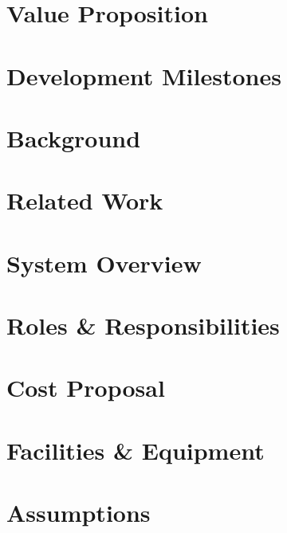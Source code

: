 \documentclass{article}
\begin{document}
\section{Value Proposition}


\section{Development Milestones}


\newpage


\section{Background}


\section{Related Work}


\newpage
\section{System Overview}


\section{Roles \& Responsibilities}


\section{Cost Proposal}


\section{Facilities \& Equipment}


\section{Assumptions}

\end{document}

